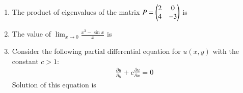 \documentclass[journal]{IEEEtran}
\begin{document}
\begin{enumerate}[leftmargin=0pt]


    \item The product of eigenvalues of the matrix $P = \begin{pmatrix}2 & 0 \\ 4 & -3\end{pmatrix}$ is
    
    \hfill{}

    \begin{enumerate}
    \end{enumerate}
    
    \item The value of $\displaystyle\lim_{x \to 0} \frac{x^3 - \sin x}{x}$ is

    \hfill{}

    \begin{enumerate}
    \end{enumerate}

    \item Consider the following partial differential equation for $u(x, y)$ with the constant $c > 1$:
    \begin{align*}
        \frac{\partial u}{\partial y} + c \frac{\partial u}{\partial x} = 0
    \end{align*}
    Solution of this equation is

    \hfill{}

    \begin{enumerate}
    \end{enumerate}
    

\end{enumerate}
\end{document}
